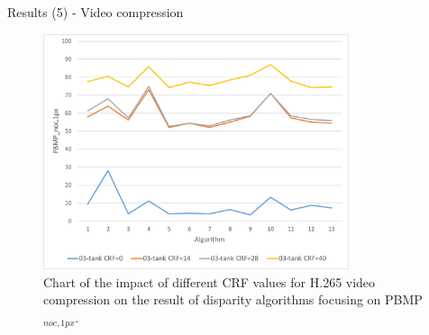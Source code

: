 \documentclass[10pt]{beamer}
\begin{document}
\begin{frame}[fragile]{Results (5) - Video compression}
  \begin{figure}[h!]
  \centering
  \includegraphics[width=0.8\textwidth]{../paper/src/images/evaluation/plots/03-tank-pbmp-noc-1-vc.pdf}
  \caption[Chart of the impact of video compression]{Chart of the impact of different CRF values for H.265 video compression on the result of disparity algorithms focusing on PBMP$_{noc,1px}$.}
  \label{fig:eval-plots-pbmp-noc1-vc}
  \end{figure}
\end{frame}
\end{document}
